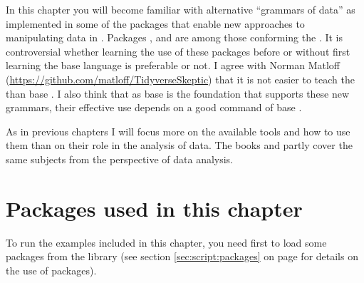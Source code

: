 \documentclass[krantz2]{krantz}\usepackage{knitr}
\begin{document}
In this chapter you will become familiar with alternative ``grammars of data'' as implemented in some of the packages that enable new approaches to manipulating data in \Rlang. Packages ,  and  are among those conforming the . It is controversial whether learning the use of these packages before or without first learning the base \Rlang language is preferable or not. I agree with Norman Matloff (\url{https://github.com/matloff/TidyverseSkeptic}) that it is not easier to teach the  than base \Rlang. I also think that as base \Rlang is the foundation that supports these new grammars, their effective use depends on a good command of base \Rlang.

As in previous chapters I will focus more on the available tools and how to use them than on their role in the analysis of data. The books  \autocite{Wickham2017} and  \autocite{Peng2016} partly cover the same subjects from the perspective of data analysis.

\section{Packages used in this chapter}

\begin{knitrout}\footnotesize
{}\color{fgcolor}\begin{kframe}
\begin{alltt}
\hlopt{::}
\end{alltt}
\end{kframe}
\end{knitrout}

To run the examples included in this chapter, you need first to load some packages from the library (see section \ref{sec:script:packages} on page \pageref{sec:script:packages} for details on the use of packages).

\begin{knitrout}\footnotesize
{}\color{fgcolor}\begin{kframe}
\begin{alltt}
\end{alltt}
\end{kframe}
\end{knitrout}
\end{document}
